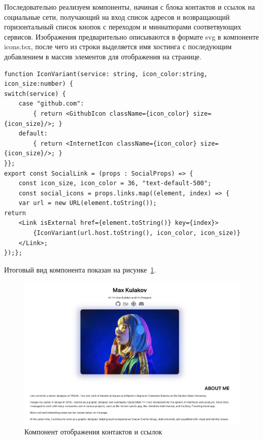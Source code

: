 \documentclass[master, och, diploma]{SCWorks}
\begin{document}
Последовательно реализуем компоненты, начиная с блока контактов и ссылок на социальные сети, получающий на вход список адресов и возвращающий горизонтальный список кнопок с переходом и миниатюрами соответвующих сервисов. Изображения предварительно описываются в формате svg в компоненте icons.tsx, после чего из строки выделяется имя хостинга с последующим добавлением в массив элементов для отображения на странице.
\begin{verbatim}
function IconVariant(service: string, icon_color:string, icon_size:number) {
switch(service) { 
    case "github.com": 
        { return <GithubIcon className={icon_color} size={icon_size}/>; } 
    default: 
        { return <InternetIcon className={icon_color} size={icon_size}/>; }
}};
export const SocialLink = (props : SocialProps) => {
    const icon_size, icon_color = 36, "text-default-500";
    const social_icons = props.links.map((element, index) => {
    var url = new URL(element.toString());
return 	
    <Link isExternal href={element.toString()} key={index}>
        {IconVariant(url.host.toString(), icon_color, icon_size)}
    </Link>;
});};
\end{verbatim}

Итоговый вид компонента показан на рисунке~\ref{fig:28}. 
\begin{figure}[!ht]
    \centering
    \includegraphics[width=12cm]{images/image-resume-1.png}
    \caption{\label{fig:28}%
        Компонент отображения контактов и ссылок}
\end{figure}
\end{document}
